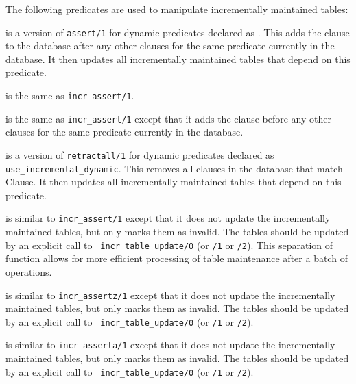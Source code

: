 The following predicates are used to manipulate incrementally
maintained tables:

\begin{description}
is a version of {\tt assert/1} for dynamic predicates declared as
.  This adds the clause to
the database after any other clauses for the same predicate currently
in the database.  It then updates all incrementally maintained tables
that depend on this predicate.

is the same as {\tt incr\_assert/1}.

is the same as {\tt incr\_assert/1} except that it adds the clause
before any other clauses for the same predicate currently in the
database.

is a version of {\tt retractall/1} for dynamic predicates declared as
{\tt use\_incremental\_dynamic}.  This removes all clauses in the database that
match Clause.  It then updates all incrementally maintained tables
that depend on this predicate.

is similar to {\tt incr\_assert/1} except that it does not update the
incrementally maintained tables, but only marks them as invalid.  The
tables should be updated by an explicit call to {\tt
incr\_table\_update/0} (or {\tt /1} or {\tt /2}).  This separation of
function allows for more efficient processing of table maintenance
after a batch of operations.

is similar to {\tt incr\_assertz/1} except that it does not update the
incrementally maintained tables, but only marks them as invalid.  The
tables should be updated by an explicit call to {\tt
incr\_table\_update/0} (or {\tt /1} or {\tt /2}).

is similar to {\tt incr\_asserta/1} except that it does not update the
incrementally maintained tables, but only marks them as invalid.  The
tables should be updated by an explicit call to {\tt
incr\_table\_update/0} (or {\tt /1} or {\tt /2}).


\end{description}
